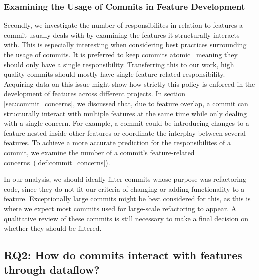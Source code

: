 \subsubsection*{Examining the Usage of Commits in Feature Development}

Secondly, we investigate the number of responsibilites in relation to features a commit usually deals with by examining the features it structurally interacts with. 
This is especially interesting when considering best practices surrounding the usage of commits.
It is preferred to keep commits atomic~\cite{hundhausen2021commit_metrics} meaning they should only have a single responsibility.
Transferring this to our work, high quality commits should mostly have single feature-related responsibility.
Acquiring data on this issue might show how strictly this policy is enforced in the development of features across different projects. 
In section \ref{sec:commit_concerns}, we discussed that, due to feature overlap, a commit can structurally interact with multiple features at the same time while only dealing with a single concern.
For example, a commit could be introducing changes to a feature nested inside other features or coordinate the interplay between several features.
To achieve a more accurate prediction for the responsibilites of a commit, we examine the number of a commit's feature-related concerns~(\ref{def:commit_concerns}).

In our analysis, we should ideally filter commits whose purpose was refactoring code, since they do not fit our criteria of changing or adding functionality to a feature.
Exceptionally large commits might be best considered for this, as this is where we expect most commits used for large-scale refactoring to appear.
A qualitative review of these commits is still necessary to make a final decision on whether they should be filtered.

\subsection*{\textbf{RQ2: How do commits interact with features through dataflow?}}

